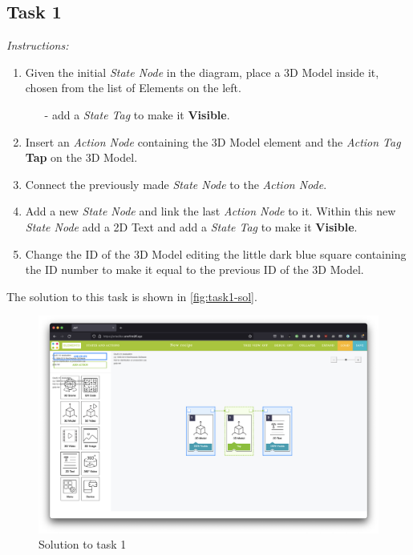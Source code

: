 \subsection*{Task 1}
    \textit{Instructions:} 
\begin{enumerate}
    \item Given the initial \textit{State Node} in the diagram, place a 3D Model inside it, chosen from the list of Elements on the left.
        \begin{itemize}
        \item[-] add a \textit{State Tag} to make it \textbf{Visible}.
        \end{itemize}
    \item Insert an \textit{Action Node} containing the 3D Model element and the \textit{Action Tag} \textbf{Tap} on the 3D Model.
    \item Connect the previously made \textit{State Node} to the \textit{Action Node}.
    \item Add a new \textit{State Node} and link the last \textit{Action Node} to it. Within this new \textit{State Node} add a 2D Text and add a \textit{State Tag} to make it \textbf{Visible}.
    \item Change the ID of the 3D Model editing the little dark blue square containing the ID number to make it equal to the previous ID of the 3D Model.
\end{enumerate}
The solution to this task is shown in \autoref{fig:task1-sol}.
\begin{figure}[h]
    \centering
    \includegraphics[width=\linewidth]{Figures/Evaluation/Tasks/task1-sol.png}
    \caption{Solution to task 1}
    \label{fig:task1-sol}
\end{figure}

